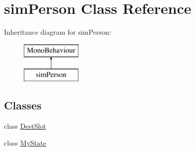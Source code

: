 \hypertarget{classsim_person}{}\section{sim\+Person Class Reference}
\label{classsim_person}
Inheritance diagram for sim\+Person\+:\begin{figure}[H]
\begin{center}
\leavevmode
\includegraphics[height=2.000000cm]{classsim_person}
\end{center}
\end{figure}
\subsection*{Classes}
\begin{DoxyCompactItemize}
\item 
class \hyperlink{classsim_person_1_1_dest_slot}{Dest\+Slot}
\item 
class \hyperlink{classsim_person_1_1_my_state}{My\+State}
\end{DoxyCompactItemize}
